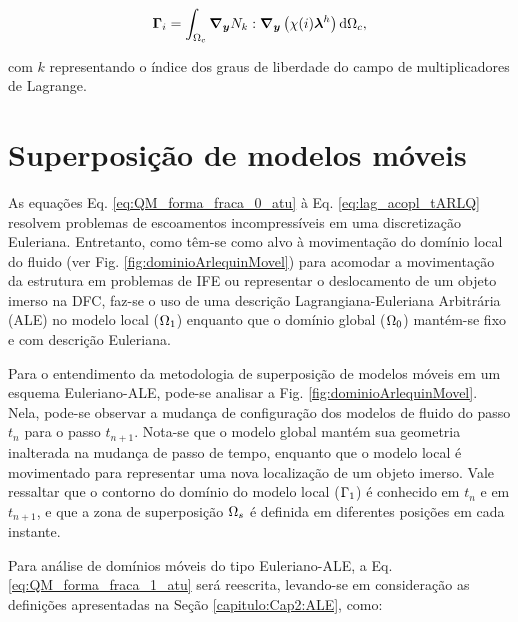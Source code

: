 \documentclass[tese_patricia]{subfiles}
\begin{document}
\begin{align}
	\mathbf{\Gamma}_{i} = \int_{\Omega_c} \boldsymbol{\nabla_y} N_{k} : \boldsymbol{\nabla_y} \left(\chi (i) \boldsymbol{\lambda}^h\right)    \mathrm{d} \Omega_c,
\end{align}


\noindent com $k$ representando o índice dos graus de liberdade do campo de multiplicadores de Lagrange.


\section{Superposição de modelos móveis}

As equações Eq. \eqref{eq:QM_forma_fraca_0_atu} à Eq. \eqref{eq:lag_acopl_tARLQ} resolvem problemas de escoamentos incompressíveis em uma discretização Euleriana. Entretanto, como têm-se como alvo à movimentação do domínio local do fluido (ver Fig. \ref{fig:dominioArlequinMovel}) para acomodar a movimentação da estrutura em problemas de IFE ou representar o deslocamento de um objeto imerso na DFC, faz-se o uso de uma descrição Lagrangiana-Euleriana Arbitrária (ALE) no modelo local ($\Omega_1$) enquanto que o domínio global ($\Omega_0$) mantém-se fixo e com descrição Euleriana. 

Para o entendimento da metodologia de superposição de modelos móveis em um esquema Euleriano-ALE, pode-se analisar a Fig. \ref{fig:dominioArlequinMovel}. Nela, pode-se observar a mudança de configuração dos modelos de fluido do passo $t_n$ para o passo $t_{n+1}$. Nota-se que o modelo global mantém sua geometria inalterada na mudança de passo de tempo, enquanto que o modelo local é movimentado para representar uma nova localização de um objeto imerso. Vale ressaltar que o contorno do domínio do modelo local ($\Gamma_1$) é conhecido em $t_n$ e em $t_{n+1}$, e que a zona de superposição $\Omega_s$ é definida em diferentes posições em cada instante.


Para análise de domínios móveis do tipo Euleriano-ALE, a Eq. \ref{eq:QM_forma_fraca_1_atu} será reescrita, levando-se em consideração as definições apresentadas na Seção \ref{capitulo:Cap2:ALE}, como:
\end{document}
